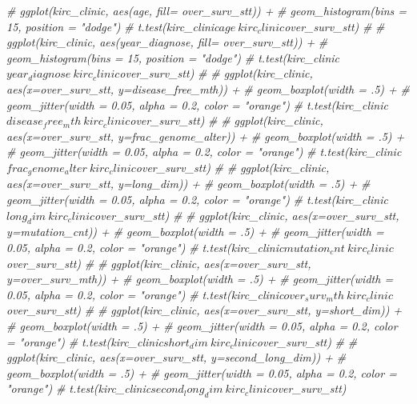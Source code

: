 \documentclass[]{article}
\newenvironment{Shaded}{\begin{snugshade}}{\end{snugshade}}
\newcommand{\CommentTok}[1]{\textcolor[rgb]{0.56,0.35,0.01}{\textit{#1}}}
\begin{document}
\begin{Shaded}
\begin{Highlighting}[]
\CommentTok{# ggplot(kirc_clinic, aes(age, fill= over_surv_stt)) +}
\CommentTok{#   geom_histogram(bins = 15, position = "dodge")}
\CommentTok{# t.test(kirc_clinic$age ~ kirc_clinic$over_surv_stt) }
\CommentTok{# }
\CommentTok{# ggplot(kirc_clinic, aes(year_diagnose, fill= over_surv_stt)) +}
\CommentTok{#   geom_histogram(bins = 15, position = "dodge")}
\CommentTok{# t.test(kirc_clinic$year_diagnose ~ kirc_clinic$over_surv_stt) }
\CommentTok{# }
\CommentTok{# ggplot(kirc_clinic, aes(x=over_surv_stt, y=disease_free_mth)) +}
\CommentTok{#   geom_boxplot(width = .5) +}
\CommentTok{#   geom_jitter(width = 0.05, alpha = 0.2, color = "orange")}
\CommentTok{# t.test(kirc_clinic$disease_free_mth ~ kirc_clinic$over_surv_stt) }
\CommentTok{# }
\CommentTok{# ggplot(kirc_clinic, aes(x=over_surv_stt, y=frac_genome_alter)) +}
\CommentTok{#   geom_boxplot(width = .5) +}
\CommentTok{#   geom_jitter(width = 0.05, alpha = 0.2, color = "orange")}
\CommentTok{# t.test(kirc_clinic$frac_genome_alter ~ kirc_clinic$over_surv_stt)}
\CommentTok{# }
\CommentTok{# ggplot(kirc_clinic, aes(x=over_surv_stt, y=long_dim)) +}
\CommentTok{#   geom_boxplot(width = .5) +}
\CommentTok{#   geom_jitter(width = 0.05, alpha = 0.2, color = "orange")}
\CommentTok{# t.test(kirc_clinic$long_dim ~ kirc_clinic$over_surv_stt)}
\CommentTok{# }
\CommentTok{# ggplot(kirc_clinic, aes(x=over_surv_stt, y=mutation_cnt)) +}
\CommentTok{#   geom_boxplot(width = .5) +}
\CommentTok{#   geom_jitter(width = 0.05, alpha = 0.2, color = "orange")}
\CommentTok{# t.test(kirc_clinic$mutation_cnt ~ kirc_clinic$over_surv_stt)}
\CommentTok{# }
\CommentTok{# ggplot(kirc_clinic, aes(x=over_surv_stt, y=over_surv_mth)) +}
\CommentTok{#   geom_boxplot(width = .5) +}
\CommentTok{#   geom_jitter(width = 0.05, alpha = 0.2, color = "orange")}
\CommentTok{# t.test(kirc_clinic$over_surv_mth ~ kirc_clinic$over_surv_stt)}
\CommentTok{# }
\CommentTok{# ggplot(kirc_clinic, aes(x=over_surv_stt, y=short_dim)) +}
\CommentTok{#   geom_boxplot(width = .5) +}
\CommentTok{#   geom_jitter(width = 0.05, alpha = 0.2, color = "orange")}
\CommentTok{# t.test(kirc_clinic$short_dim ~ kirc_clinic$over_surv_stt)}
\CommentTok{# }
\CommentTok{# ggplot(kirc_clinic, aes(x=over_surv_stt, y=second_long_dim)) +}
\CommentTok{#   geom_boxplot(width = .5) +}
\CommentTok{#   geom_jitter(width = 0.05, alpha = 0.2, color = "orange")}
\CommentTok{# t.test(kirc_clinic$second_long_dim ~ kirc_clinic$over_surv_stt)}
\end{Highlighting}
\end{Shaded}
\end{document}
